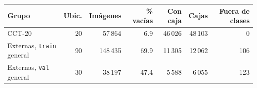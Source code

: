 \begin{tabular}{lrrrrrr}
\toprule
Grupo & Ubic. & Imágenes & \% vacías & Con caja & Cajas & Fuera de clases \\
\midrule
CCT-20 & 20 & 57\,864 & 6.9 & 46\,026 & 48\,103 & 0 \\
Externas, \texttt{train} general & 90 & 148\,435 & 69.9 & 11\,305 & 12\,062 & 106 \\
Externas, \texttt{val} general & 30 & 38\,197 & 47.4 & 5\,588 & 6\,055 & 123 \\
\bottomrule
\end{tabular}
